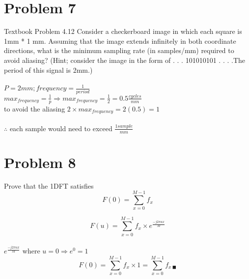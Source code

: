 \documentclass[12pt]{article}
\begin{document}
    \section{Problem 7}
    Textbook Problem 4.12
    Consider a checkerboard image in which each square is 1mm * 1 mm. Assuming that the 
    image extends infinitely in both coordinate directions, what is the minimum sampling
     rate (in samples/mm) required to avoid aliasing?
    (Hint; consider the image in the form of . . . 101010101 . . . .The period
     of this signal is 2mm.)
     \\
     \\
     $P= 2mm; frequency = \frac{1}{period}$\\
     $max_{frequency} = \frac{1}{p} \Rightarrow max_{frequency} = \frac{1}{2}= 0.5 \frac{cycles}{mm} $  \\
     to avoid the aliasing $2\times max_{frequency} = 2(0.5) = 1$
     \\
     \\
     $\therefore$ each sample would need to exceed $\frac{1 sample}{mm}$

     \section{Problem 8}
     Prove that the 1DFT satisfies
     $$F(0)= \sum_{x=0}^{M-1}f_{x}$$

    $$F(u)= \sum_{x=0}^{M-1}f_{x} \times e^{\frac{-j2\pi ux}{M} }$$\\
    $e^{ \frac{-j2\pi ux}{M} }$ where $u=0 \Rightarrow  e^{0}=1$
    $$F(0)= \sum_{x=0}^{M-1}f_{x} \times 1 = \sum_{x=0}^{M-1}f_{x \ \blacksquare}  $$
\end{document}
